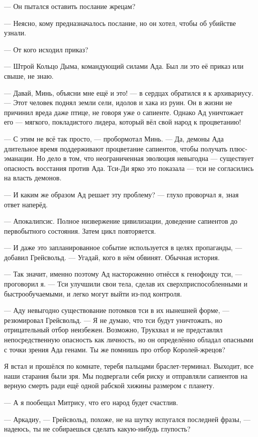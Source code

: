 --- Он пытался оставить послание жрецам?

--- Неясно, кому предназначалось послание, но он хотел, чтобы об убийстве узнали.

--- От кого исходил приказ?

--- Штрой Кольцо Дыма, командующий силами Ада.
Был ли это её приказ или свыше, не знаю.

--- Давай, Минь, объясни мне ещё и это! --- в сердцах обратился я к архивариусу.
--- Этот человек поднял земли сели, идолов и хака из руин.
Он в жизни не причинил вреда даже птице, не говоря уже о сапиенте.
Однако Ад уничтожает его --- мягкого, покладистого лидера, который вёл свой народ к процветанию!

--- С этим не всё так просто, --- пробормотал Минь.
--- Да, демоны Ада длительное время поддерживают процветание сапиентов, чтобы получать плюс-эманации.
Но дело в том, что неограниченная эволюция невыгодна --- существует опасность восстания против Ада.
Тси-Ди ярко это показала --- тси не согласились на власть демонов.

--- И каким же образом Ад решает эту проблему? --- глухо проворчал я, зная ответ наперёд.

--- Апокалипсис.
Полное низвержение цивилизации, доведение сапиентов до первобытного состояния.
Затем цикл повторяется.

--- И даже это запланированное событие используется в целях пропаганды, --- добавил Грейсвольд.
--- Угадай, кого в нём обвинят.
Обычная история.

--- Так значит, именно поэтому Ад настороженно отнёсся к генофонду тси, --- проговорил я.
--- Тси улучшили свои тела, сделав их сверхприспособленными и быстрообучаемыми, и легко могут выйти из-под контроля.

--- Аду невыгодно существование потомков тси в их нынешней форме, --- резюмировал Грейсвольд.
--- Я не думаю, что тси будут уничтожать, но отрицательный отбор неизбежен.
Возможно, Трукхвал и не представлял непосредственную опасность как личность, но он определённо обладал опасными с точки зрения Ада генами.
Ты же помнишь про отбор Королей-жрецов?

Я встал и прошёлся по комнате, теребя пальцами браслет-терминал.
Выходит, все наши старания были зря.
Мы подвергали себя риску и отправляли сапиентов на верную смерть ради ещё одной рабской хижины размером с планету.

--- А я пообещал Митрису, что его народ будет счастлив.

--- Аркадиу, --- Грейсвольд, похоже, не на шутку испугался последней фразы, --- надеюсь, ты не собираешься сделать какую-нибудь глупость?

